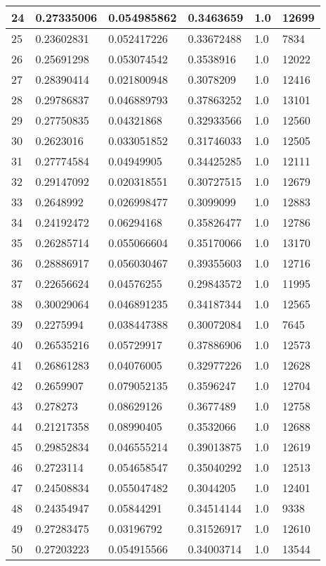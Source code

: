 \begin{longtable}{|l|l|l|l|l|l|}
24 & 0.27335006 & 0.054985862 & 0.3463659 & 1.0 & 12699 \\ \hline 
25 & 0.23602831 & 0.052417226 & 0.33672488 & 1.0 & 7834 \\ \hline 
26 & 0.25691298 & 0.053074542 & 0.3538916 & 1.0 & 12022 \\ \hline 
27 & 0.28390414 & 0.021800948 & 0.3078209 & 1.0 & 12416 \\ \hline 
28 & 0.29786837 & 0.046889793 & 0.37863252 & 1.0 & 13101 \\ \hline 
29 & 0.27750835 & 0.04321868 & 0.32933566 & 1.0 & 12560 \\ \hline 
30 & 0.2623016 & 0.033051852 & 0.31746033 & 1.0 & 12505 \\ \hline 
31 & 0.27774584 & 0.04949905 & 0.34425285 & 1.0 & 12111 \\ \hline 
32 & 0.29147092 & 0.020318551 & 0.30727515 & 1.0 & 12679 \\ \hline 
33 & 0.2648992 & 0.026998477 & 0.3099099 & 1.0 & 12883 \\ \hline 
34 & 0.24192472 & 0.06294168 & 0.35826477 & 1.0 & 12786 \\ \hline 
35 & 0.26285714 & 0.055066604 & 0.35170066 & 1.0 & 13170 \\ \hline 
36 & 0.28886917 & 0.056030467 & 0.39355603 & 1.0 & 12716 \\ \hline 
37 & 0.22656624 & 0.04576255 & 0.29843572 & 1.0 & 11995 \\ \hline 
38 & 0.30029064 & 0.046891235 & 0.34187344 & 1.0 & 12565 \\ \hline 
39 & 0.2275994 & 0.038447388 & 0.30072084 & 1.0 & 7645 \\ \hline 
40 & 0.26535216 & 0.05729917 & 0.37886906 & 1.0 & 12573 \\ \hline 
41 & 0.26861283 & 0.04076005 & 0.32977226 & 1.0 & 12628 \\ \hline 
42 & 0.2659907 & 0.079052135 & 0.3596247 & 1.0 & 12704 \\ \hline 
43 & 0.278273 & 0.08629126 & 0.3677489 & 1.0 & 12758 \\ \hline 
44 & 0.21217358 & 0.08990405 & 0.3532066 & 1.0 & 12688 \\ \hline 
45 & 0.29852834 & 0.046555214 & 0.39013875 & 1.0 & 12619 \\ \hline 
46 & 0.2723114 & 0.054658547 & 0.35040292 & 1.0 & 12513 \\ \hline 
47 & 0.24508834 & 0.055047482 & 0.3044205 & 1.0 & 12401 \\ \hline 
48 & 0.24354947 & 0.05844291 & 0.34514144 & 1.0 & 9338 \\ \hline 
49 & 0.27283475 & 0.03196792 & 0.31526917 & 1.0 & 12610 \\ \hline 
50 & 0.27203223 & 0.054915566 & 0.34003714 & 1.0 & 13544 \\ \hline 
\end{longtable}
